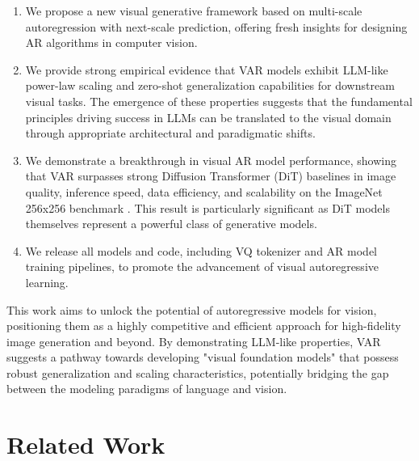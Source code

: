 \documentclass{article}
\begin{document}
\begin{enumerate}[leftmargin=*,itemsep=2pt,topsep=3pt]
    \item We propose a new visual generative framework based on multi-scale autoregression with next-scale prediction, offering fresh insights for designing AR algorithms in computer vision.
    \item We provide strong empirical evidence that VAR models exhibit LLM-like power-law scaling and zero-shot generalization capabilities for downstream visual tasks. The emergence of these properties suggests that the fundamental principles driving success in LLMs can be translated to the visual domain through appropriate architectural and paradigmatic shifts.
    \item We demonstrate a breakthrough in visual AR model performance, showing that VAR surpasses strong Diffusion Transformer (DiT) baselines \cite{peebles2023scalable} in image quality, inference speed, data efficiency, and scalability on the ImageNet 256x256 benchmark \cite{deng2009imagenet}. This result is particularly significant as DiT models themselves represent a powerful class of generative models.
    \item We release all models and code, including VQ tokenizer and AR model training pipelines, to promote the advancement of visual autoregressive learning. %
\end{enumerate}

This work aims to unlock the potential of autoregressive models for vision, positioning them as a highly competitive and efficient approach for high-fidelity image generation and beyond. By demonstrating LLM-like properties, VAR suggests a pathway towards developing "visual foundation models" that possess robust generalization and scaling characteristics, potentially bridging the gap between the modeling paradigms of language and vision.

\section{Related Work}
\label{sec:related_work}
\end{document}
